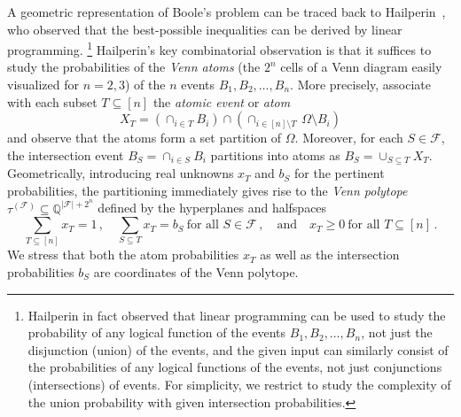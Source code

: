 \documentclass[11pt]{article}
\newcommand{\vp}{\ensuremath{\tau}}
\begin{document}
A geometric representation of Boole's problem
can be traced back to Hailperin~\cite{Hailperin1965}, who observed that
the best-possible inequalities can be derived by linear programming.%
\footnote{Hailperin in fact observed that linear programming can be used
to study the probability of any logical function of the events 
$B_1,B_2,\ldots,B_n$, not just the disjunction (union) of the events, 
and the given input can similarly consist of the probabilities of 
any logical functions of the events, not just conjunctions (intersections) 
of events. For simplicity, we restrict to study the complexity of 
the union probability with given intersection probabilities.}{}
Hailperin's key combinatorial observation is that it suffices to study the 
probabilities of the {\em Venn atoms} 
(the $2^n$ cells of a Venn diagram easily visualized for $n=2,3$) 
of the $n$ events $B_1,B_2,\ldots,B_n$. 
More precisely, associate with each subset $T\subseteq [n]$
the {\em atomic event} or {\em atom} 
\[
X_T=(\cap_{i\in T}B_i)\cap(\cap_{i\in[n]\setminus T}\,\Omega\!\setminus\!B_i)
\]
and observe that the atoms form a set partition of $\Omega$.
Moreover, for each $S\in\mathcal{F}$, the intersection event 
$B_S=\cap_{i\in S}B_i$ partitions into atoms as $B_S=\cup_{S\subseteq T}X_T$.
Geometrically, introducing real unknowns $x_T$ and $b_S$ for 
the pertinent probabilities, the partitioning immediately gives 
rise to the {\em Venn polytope} 
$\vp^{(\mathcal{F})}\subseteq\mathbb{Q}^{|\mathcal{F}|+2^n}$ defined 
by the hyperplanes and halfspaces
\begin{equation}
\label{eq:param-zeta}
    \sum_{T\subseteq[n]}x_T=1\,,\quad
  \sum_{S\subseteq T}x_T=b_S\ 
\text{for all $S\in\mathcal{F}$}\,,\quad\text{and}\quad
                       x_T \geq 0\ \text{for all $T\subseteq[n]$}\,.
\end{equation}
We stress that both the atom probabilities $x_T$ as well as
the intersection probabilities $b_S$ are coordinates of the Venn polytope. 
\end{document}
